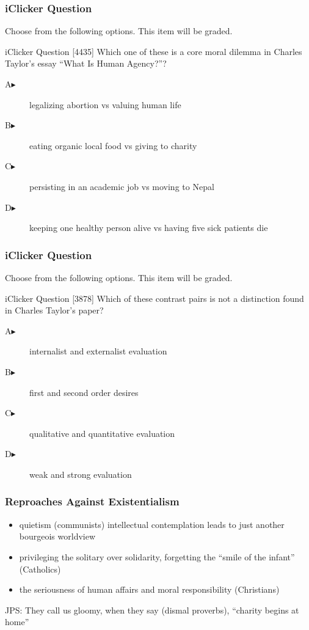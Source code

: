 \documentclass[xcolor=dvipsnames]{beamer}
\begin{document}
\begin{frame}
  \frametitle{iClicker Question}
Choose from the following options. This item will be graded.
\begin{block}{iClicker Question}
[4435] Which one of these is a core moral dilemma in Charles Taylor's essay
``What Is Human Agency?''?
\end{block}
\begin{description}
\item[A\hspace{.2in}$\blacktriangleright$] legalizing abortion vs valuing human life
\item[B\hspace{.2in}$\blacktriangleright$] eating organic local food vs giving to charity
\item[C\hspace{.2in}$\blacktriangleright$] persisting in an academic job vs moving to Nepal
\item[D\hspace{.2in}$\blacktriangleright$] keeping one healthy person alive vs having five sick patients die
\end{description}
\end{frame}

\begin{frame}
  \frametitle{iClicker Question}
Choose from the following options. This item will be graded.
\begin{block}{iClicker Question}
[3878] Which of these contrast pairs is not a distinction found in Charles
Taylor's paper?
\end{block}
\begin{description}
\item[A\hspace{.2in}$\blacktriangleright$] internalist and externalist evaluation
\item[B\hspace{.2in}$\blacktriangleright$] first and second order desires
\item[C\hspace{.2in}$\blacktriangleright$] qualitative and quantitative evaluation
\item[D\hspace{.2in}$\blacktriangleright$] weak and strong evaluation
\end{description}
\end{frame}

\begin{frame}
  \frametitle{Reproaches Against Existentialism}
  \begin{itemize}
  \item quietism (communists) intellectual contemplation leads to just
    another bourgeois worldview
  \item privileging the solitary over solidarity, forgetting the
    ``smile of the infant'' (Catholics)
  \item the seriousness of human affairs and moral responsibility (Christians)
  \end{itemize}
  JPS: They call us gloomy, when they say (dismal proverbs), ``charity
  begins at home''
\end{frame}
\end{document}
